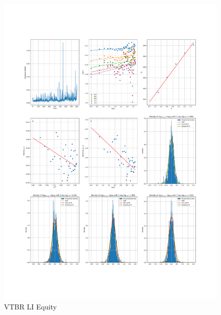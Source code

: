     \begin{figure}[h]
        \centering
        \includegraphics[width=\textwidth]{fig/VTBR LI Equity.pdf}
        \caption{VTBR LI Equity}
    \end{figure} 
        
